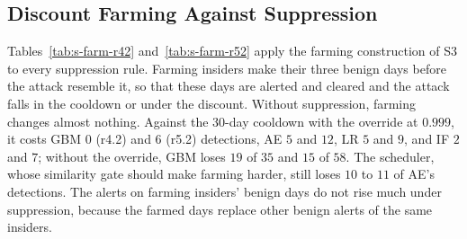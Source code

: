 \documentclass[10pt,onecolumn,letterpaper]{article}
\begin{document}
\subsection{Discount Farming Against Suppression}
Tables~\ref{tab:s-farm-r42} and~\ref{tab:s-farm-r52} apply the farming construction of S3 to every suppression rule. Farming insiders make their three benign days before the attack resemble it, so that these days are alerted and cleared and the attack falls in the cooldown or under the discount. Without suppression, farming changes almost nothing. Against the 30-day cooldown with the override at $0.999$, it costs GBM $0$ (r4.2) and $6$ (r5.2) detections, AE $5$ and $12$, LR $5$ and $9$, and IF $2$ and $7$; without the override, GBM loses $19$ of $35$ and $15$ of $58$. The scheduler, whose similarity gate should make farming harder, still loses $10$ to $11$ of AE's detections. The alerts on farming insiders' benign days do not rise much under suppression, because the farmed days replace other benign alerts of the same insiders.
\end{document}
